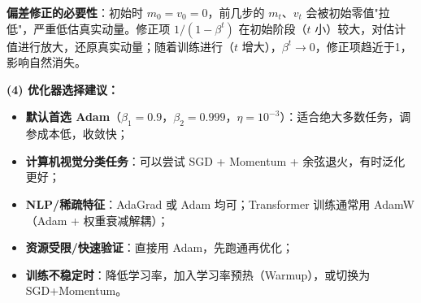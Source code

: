\documentclass[a4paper,11pt]{ctexart}
\begin{document}
\begin{solutionbox}[参考答案与详细解析]
    \textbf{偏差修正的必要性}：初始时 $m_0=v_0=0$，前几步的 $m_t$、$v_t$ 会被初始零值"拉低"，严重低估真实动量。修正项 $1/(1-\beta^t)$ 在初始阶段（$t$ 小）较大，对估计值进行放大，还原真实动量；随着训练进行（$t$ 增大），$\beta^t \to 0$，修正项趋近于1，影响自然消失。

    \textbf{(4) 优化器选择建议：}

    \begin{itemize}
        \item \textbf{默认首选 Adam}（$\beta_1=0.9$，$\beta_2=0.999$，$\eta=10^{-3}$）：适合绝大多数任务，调参成本低，收敛快；
        \item \textbf{计算机视觉分类任务}：可以尝试 SGD + Momentum + 余弦退火，有时泛化更好；
        \item \textbf{NLP/稀疏特征}：AdaGrad 或 Adam 均可；Transformer 训练通常用 AdamW（Adam + 权重衰减解耦）；
        \item \textbf{资源受限/快速验证}：直接用 Adam，先跑通再优化；
        \item \textbf{训练不稳定时}：降低学习率，加入学习率预热（Warmup），或切换为 SGD+Momentum。
    \end{itemize}
\end{solutionbox}
\end{document}
